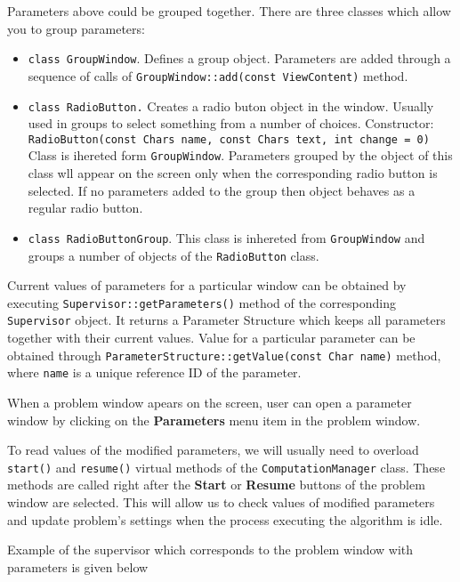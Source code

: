 \documentclass[12pt]{article}
\begin{document}
Parameters above could be grouped together. There are three  classes
which allow you to group parameters:
\begin{itemize}
\item {\tt class  GroupWindow}. Defines a group
object. Parameters are added through a sequence of calls of
{\tt GroupWindow::add(const ViewContent)} method.
\item {\tt class RadioButton.} Creates a radio buton object in the
window. Usually used in groups to select something from a number of choices.
Constructor:\\
{\tt  RadioButton(const Chars name, const Chars text, int change = 0)} \\
Class is ihereted form {\tt GroupWindow}.
Parameters grouped by the object of this
class wll appear on the screen only when the corresponding
radio button is selected. If no parameters added to the group then
object behaves as a regular radio button.
\item {\tt class  RadioButtonGroup}. This class
is inhereted from {\tt GroupWindow} and groups a number
of objects of the {\tt RadioButton} class.
\end{itemize}

Current values of parameters for a particular window can be obtained
by executing  {\tt Supervisor::getParameters()} method
of the corresponding {\tt Supervisor} object.
It returns a Parameter Structure which keeps all parameters together
with their current values. Value for  a particular parameter can
be obtained through {\tt ParameterStructure::getValue(const Char name)}
method, where {\tt name} is a unique reference ID of the parameter.


When a problem window apears on the screen, user can open a  parameter
window by clicking  on the {\bf Parameters} menu item in the
problem window.

To read values of the modified parameters, we will usually need to
overload {\tt start()} and {\tt resume()} virtual methods of the
{\tt ComputationManager} class. These methods are called right after
the  {\bf Start} or {\bf Resume} buttons of the problem window
are selected. This will allow us to check values of
modified parameters and update problem's settings when the process executing
the algorithm is idle.

Example of the supervisor which corresponds to the problem window with
parameters is given below
\end{document}
